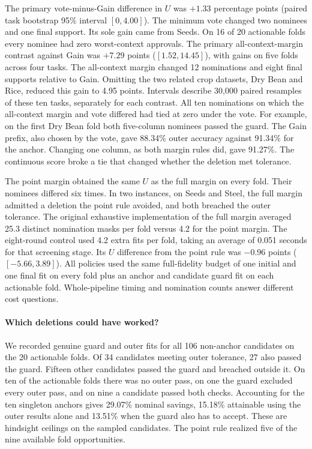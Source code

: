 The primary vote-minus-Gain difference in $U$ was $+1.33$ percentage points (paired task bootstrap 95\% interval $[0,4.00]$). The minimum vote changed two nominees and one final support. Its sole gain came from Seeds. On 16 of 20 actionable folds every nominee had zero worst-context approvals. The primary all-context-margin contrast against Gain was $+7.29$ points ($[1.52,14.45]$), with gains on five folds across four tasks. The all-context margin changed 12 nominations and eight final supports relative to Gain. Omitting the two related crop datasets, Dry Bean and Rice, reduced this gain to 4.95 points. Intervals describe 30,000 paired resamples of these ten tasks, separately for each contrast. All ten nominations on which the all-context margin and vote differed had tied at zero under the vote. For example, on the first Dry Bean fold both five-column nominees passed the guard. The Gain prefix, also chosen by the vote, gave 88.34\% outer accuracy against 91.34\% for the anchor. Changing one column, as both margin rules did, gave 91.27\%. The continuous score broke a tie that changed whether the deletion met tolerance.

The point margin obtained the same $U$ as the full margin on every fold. Their nominees differed six times. In two instances, on Seeds and Steel, the full margin admitted a deletion the point rule avoided, and both breached the outer tolerance. The original exhaustive implementation of the full margin averaged 25.3 distinct nomination masks per fold versus 4.2 for the point margin. The eight-round control used 4.2 extra fits per fold, taking an average of 0.051 seconds for that screening stage. Its $U$ difference from the point rule was $-0.96$ points ($[-5.66,3.89]$). All policies used the same full-fidelity budget of one initial and one final fit on every fold plus an anchor and candidate guard fit on each actionable fold. Whole-pipeline timing and nomination counts answer different cost questions.

\paragraph{Which deletions could have worked?}
We recorded genuine guard and outer fits for all 106 non-anchor candidates on the 20 actionable folds. Of 34 candidates meeting outer tolerance, 27 also passed the guard. Fifteen other candidates passed the guard and breached outside it. On ten of the actionable folds there was no outer pass, on one the guard excluded every outer pass, and on nine a candidate passed both checks. Accounting for the ten singleton anchors gives 29.07\% nominal savings, 15.18\% attainable using the outer results alone and 13.51\% when the guard also has to accept. These are hindsight ceilings on the sampled candidates. The point rule realized five of the nine available fold opportunities.


